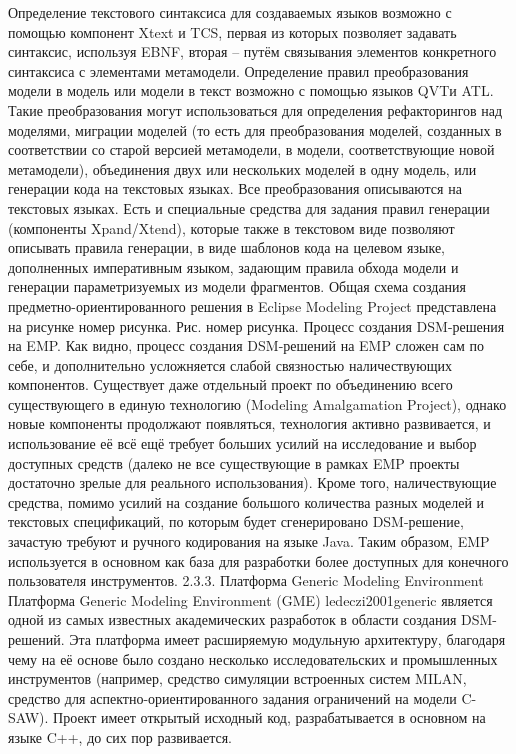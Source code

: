 Определение текстового синтаксиса для создаваемых языков возможно с помощью компонент Xtext и TCS, первая из которых позволяет задавать синтаксис, используя EBNF, вторая – путём связывания элементов конкретного синтаксиса с элементами метамодели. Определение правил преобразования модели в модель или модели в текст возможно с помощью языков QVTи ATL. Такие преобразования могут использоваться для определения рефакторингов над моделями, миграции моделей (то есть для преобразования моделей, созданных в соответствии со старой версией метамодели, в модели, соответствующие новой метамодели), объединения двух или нескольких моделей в одну модель, или генерации кода на текстовых языках. Все преобразования описываются на текстовых языках. Есть и специальные средства для задания правил генерации (компоненты Xpand/Xtend), которые также в текстовом виде позволяют описывать правила генерации, в виде шаблонов кода на целевом языке, дополненных императивным языком, задающим правила обхода модели и генерации параметризуемых из модели фрагментов. Общая схема создания предметно-ориентированного решения в Eclipse Modeling Project представлена на рисунке номер рисунка.
Рис. номер рисунка. Процесс создания DSM-решения на EMP.
	Как видно, процесс создания DSM-решений на EMP сложен сам по себе, и дополнительно усложняется слабой связностью наличествующих компонентов. Существует даже отдельный проект по объединению всего существующего в единую технологию (Modeling Amalgamation Project), однако новые компоненты продолжают появляться, технология активно развивается, и использование её всё ещё требует больших усилий на исследование и выбор доступных средств (далеко не все существующие в рамках EMP проекты достаточно зрелые для реального использования). Кроме того, наличествующие средства, помимо усилий на создание большого количества разных моделей и текстовых спецификаций, по которым будет сгенерировано DSM-решение, зачастую требуют и ручного кодирования на языке Java. Таким образом, EMP используется в основном как база для разработки более доступных для конечного пользователя инструментов.
2.3.3. Платформа Generic Modeling Environment
	Платформа Generic Modeling Environment (GME) ledeczi2001generic является одной из самых известных академических разработок в области создания DSM-решений. Эта платформа имеет расширяемую модульную архитектуру, благодаря чему на её основе было создано несколько исследовательских и промышленных инструментов (например, средство симуляции встроенных систем MILAN, средство для аспектно-ориентированного задания ограничений на модели C-SAW). Проект имеет открытый исходный код, разрабатывается в основном на языке C++, до сих пор развивается.
